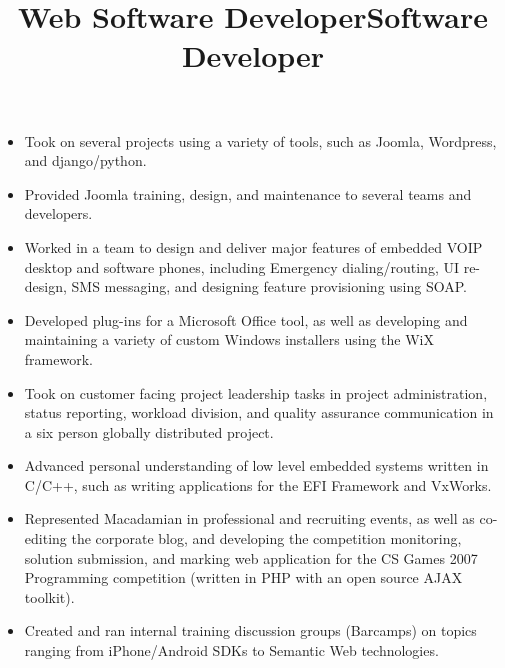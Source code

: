 \begin{resume}
\title{Web Software Developer}
\begin{position}
\begin{itemize}
\item Took on several projects using a variety of tools, such as Joomla, Wordpress, and django/python.
\item Provided Joomla training, design, and maintenance to several teams and developers.
\end{itemize}
\end{position}

\title{Software Developer}
\begin{position}
\begin{itemize}
\item Worked in a team to design and deliver major features of embedded VOIP desktop and software phones, including Emergency dialing/routing, UI re-design, SMS messaging, and designing feature provisioning using SOAP.
\item Developed plug-ins for a Microsoft Office tool, as well as developing and maintaining a variety of custom Windows installers using the WiX framework.
\item Took on customer facing project leadership tasks in project administration, status reporting, workload division, and quality assurance communication in a six person globally distributed project.
\item Advanced personal understanding of low level embedded systems written in C/C++, such as writing applications for the EFI Framework and VxWorks.
\item Represented Macadamian in professional and recruiting events, as well as co-editing the corporate blog, and developing the competition monitoring, solution submission, and marking web application for the CS Games 2007 Programming competition (written in PHP with an open source AJAX toolkit).
\item Created and ran internal training discussion groups (Barcamps) on topics ranging from iPhone/Android SDKs to Semantic Web technologies.
\end{itemize}
\end{position}


\end{resume}
